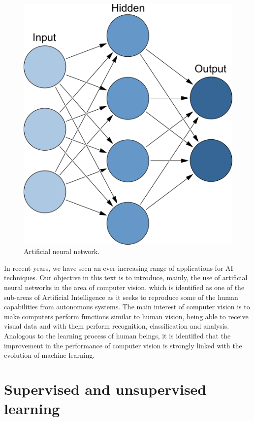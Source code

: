 \begin{figure}
    \centering
    \includegraphics[scale=0.8]{figure102.png}
    \caption{Artificial neural network.}
    \label{fig:figure102}
\end{figure}

In recent years, we have seen an ever-increasing range of applications for AI techniques. Our objective in this text is to introduce, mainly, the use of artificial neural networks in the area of computer vision, which is identified as one of the sub-areas of Artificial Intelligence as it seeks to reproduce some of the human capabilities from autonomous systems. The main interest of computer vision is to make computers perform functions similar to human vision, being able to receive visual data and with them perform recognition, classification and analysis. Analogous to the learning process of human beings, it is identified that the improvement in the performance of computer vision is strongly linked with the evolution of machine learning.

\section{Supervised and unsupervised learning}

